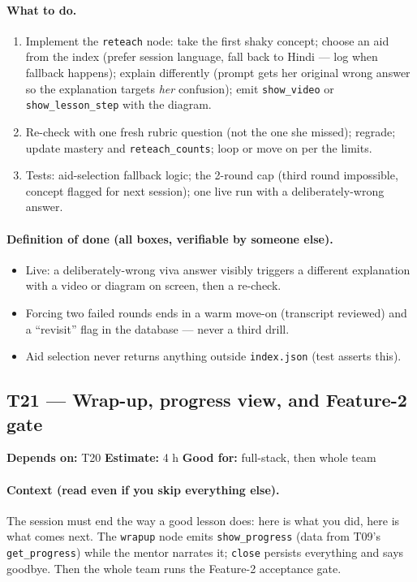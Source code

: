 \documentclass[11pt]{article}
\newcommand{\code}[1]{\texttt{#1}}
\newcommand{\taskmeta}[3]{\noindent\textbf{Depends on:} #1 \quad\textbullet\quad \textbf{Estimate:} #2 \quad\textbullet\quad \textbf{Good for:} #3\par\vspace{2pt}}
\newcommand{\ctx}[1]{\paragraph{Context (read even if you skip everything else).} #1}
\newcommand{\dod}{\paragraph{Definition of done (all boxes, verifiable by someone else).}}
\begin{document}
\paragraph{What to do.}
\begin{enumerate}
  \item Implement the \code{reteach} node: take the first shaky concept; choose an aid from the index (prefer session language, fall back to Hindi --- log when fallback happens); explain differently (prompt gets her original wrong answer so the explanation targets \emph{her} confusion); emit \code{show\_video} or \code{show\_lesson\_step} with the diagram.
  \item Re-check with one fresh rubric question (not the one she missed); regrade; update mastery and \code{reteach\_counts}; loop or move on per the limits.
  \item Tests: aid-selection fallback logic; the 2-round cap (third round impossible, concept flagged for next session); one live run with a deliberately-wrong answer.
\end{enumerate}
\dod
\begin{itemize}
  \item Live: a deliberately-wrong viva answer visibly triggers a different explanation with a video or diagram on screen, then a re-check.
  \item Forcing two failed rounds ends in a warm move-on (transcript reviewed) and a ``revisit'' flag in the database --- never a third drill.
  \item Aid selection never returns anything outside \code{index.json} (test asserts this).
\end{itemize}

\subsection{T21 --- Wrap-up, progress view, and Feature-2 gate}
\taskmeta{T20}{4 h}{full-stack, then whole team}
\ctx{The session must end the way a good lesson does: here is what you did, here is what comes next. The \code{wrapup} node emits \code{show\_progress} (data from T09's \code{get\_progress}) while the mentor narrates it; \code{close} persists everything and says goodbye. Then the whole team runs the Feature-2 acceptance gate.}
\end{document}
